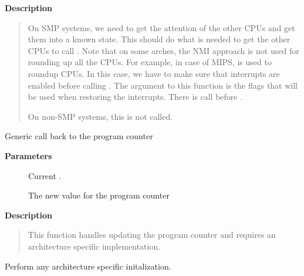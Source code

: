 \documentclass[a4paper,8pt,english]{sphinxmanual}
\begin{document}
\textbf{Description}
\begin{quote}

On SMP systems, we need to get the attention of the other CPUs
and get them into a known state.  This should do what is needed
to get the other CPUs to call . Note that on some arches,
the NMI approach is not used for rounding up all the CPUs. For example,
in case of MIPS,  is used to roundup CPUs. In
this case, we have to make sure that interrupts are enabled before
calling . The argument to this function is
the flags that will be used when restoring the interrupts. There is
 call before {\hyperref[dev\string-tools/kgdb:c.kgdb_roundup_cpus]{}}.

On non-SMP systems, this is not called.
\end{quote}

\begin{fulllineitems}
\label{dev-tools/kgdb:c.kgdb_arch_set_pc}
Generic call back to the program counter

\end{fulllineitems}


\textbf{Parameters}
\begin{description}
\item[{}] \leavevmode
Current .

\item[{}] \leavevmode
The new value for the program counter

\end{description}

\textbf{Description}
\begin{quote}

This function handles updating the program counter and requires an
architecture specific implementation.
\end{quote}

\begin{fulllineitems}
\label{dev-tools/kgdb:c.kgdb_arch_late}
Perform any architecture specific initalization.

\end{fulllineitems}
\end{document}
